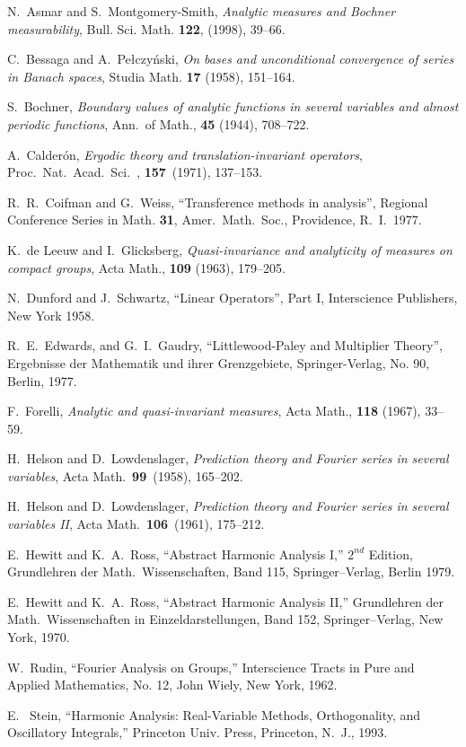 \documentclass[12pt]{article}
\begin{document}
\begin{thebibliography}{Dillo 83}

   N.\ Asmar and S.\ Montgomery-Smith, 
{\em Analytic measures and Bochner measurability},
 Bull. Sci. Math. {\bf 122}, (1998), 39--66.

 

  C.\ Bessaga and A.\ Pe\l czy\'nski, 
{\em On bases and unconditional 
convergence of series in Banach spaces}, 
Studia Math. {\bf 17} (1958), 151--164.

 S.\ Bochner, 
{\em Boundary values of analytic functions in 
several variables and almost periodic functions}, 
Ann.\ of Math., {\bf 45} (1944), 708--722.

  A.\ Calder\'{o}n, 
{\em Ergodic theory and translation-invariant operators}, 
Proc.\ Nat.\ Acad.\ Sci.\ , {\bf 157}\ (1971), 137--153.

  R.\ R.\ Coifman and G.\ Weiss,
``Transference methods in analysis'', Regional 
Conference Series in Math. {\bf 31}, Amer.\ Math.\ Soc., 
Providence, R.\ I.\, 1977.

  K.\ de Leeuw and I.\ Glicksberg, 
{\em Quasi-invariance and analyticity of measures on compact groups},
Acta Math., {\bf 109} (1963), 179--205.

  N.\ Dunford and J.\ Schwartz,
``Linear Operators'', Part I,  
Interscience Publishers, New York 1958. 

    R.\ E.\ Edwards, and G.\ I.\ Gaudry,
``Littlewood-Paley and Multiplier Theory'', 
Ergebnisse der Mathematik
und ihrer Grenzgebiete, Springer-Verlag, No. 90,  
Berlin, 1977.

  F.\ Forelli,
{\em Analytic and quasi-invariant measures}, 
Acta Math., {\bf 118} (1967), 33--59.

  H.\ Helson and D.\ Lowdenslager,
{\em Prediction theory and Fourier series in several variables}, 
Acta Math.\ {\bf 99}\ (1958), 165--202.

  H.\ Helson and D.\ Lowdenslager,
{\em Prediction theory and Fourier series in several variables II}, 
Acta Math.\ {\bf 106}\ (1961), 175--212.

 E.\ Hewitt and K.\ A.\ Ross,
``Abstract Harmonic Analysis I,''  $2^{nd}$ Edition, Grundlehren der
Math.\ Wissenschaften, Band 115, Springer--Verlag, Berlin 1979.

 E.\ Hewitt and K.\ A.\ Ross,
``Abstract Harmonic Analysis II,'' Grundlehren der
Math.\ Wissenschaften in Einzeldarstellungen, Band
152, Springer--Verlag, New York, 1970.

 
 
 W.\ Rudin, ``Fourier Analysis on Groups,''
Interscience Tracts in Pure and Applied Mathematics, No. 12, 
John Wiely, New York, 1962.

 E. \ Stein, ``Harmonic Analysis:
Real-Variable Methods, Orthogonality, and Oscillatory Integrals,'' 
Princeton Univ. Press, Princeton, N.\ J., 1993.

 
\end{thebibliography}
\end{document}
